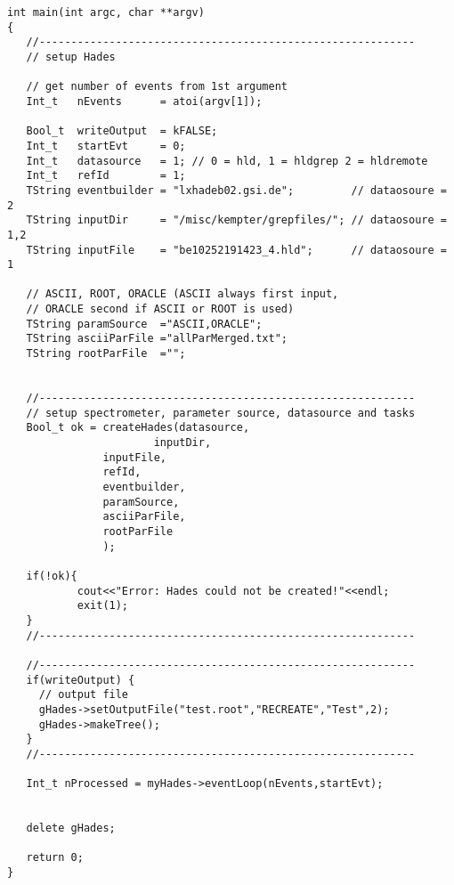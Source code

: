 \begin{lstlisting}
int main(int argc, char **argv)
{
   //-----------------------------------------------------------
   // setup Hades
   
   // get number of events from 1st argument
   Int_t   nEvents      = atoi(argv[1]); 
   
   Bool_t  writeOutput  = kFALSE;
   Int_t   startEvt     = 0;
   Int_t   datasource   = 1; // 0 = hld, 1 = hldgrep 2 = hldremote
   Int_t   refId        = 1;
   TString eventbuilder = "lxhadeb02.gsi.de";         // dataosoure = 2
   TString inputDir     = "/misc/kempter/grepfiles/"; // dataosoure = 1,2
   TString inputFile    = "be10252191423_4.hld";      // dataosoure = 1

   // ASCII, ROOT, ORACLE (ASCII always first input, 
   // ORACLE second if ASCII or ROOT is used)
   TString paramSource  ="ASCII,ORACLE";  
   TString asciiParFile ="allParMerged.txt";
   TString rootParFile  ="";

   
   //-----------------------------------------------------------
   // setup spectrometer, parameter source, datasource and tasks
   Bool_t ok = createHades(datasource,
        	           inputDir,
			   inputFile,
			   refId,
			   eventbuilder,
			   paramSource,
			   asciiParFile,
			   rootParFile
			   );
   
   if(!ok){
           cout<<"Error: Hades could not be created!"<<endl;
           exit(1);
   }
   //-----------------------------------------------------------

   //-----------------------------------------------------------
   if(writeOutput) {
     // output file
     gHades->setOutputFile("test.root","RECREATE","Test",2);
     gHades->makeTree();
   }
   //-----------------------------------------------------------
   
   Int_t nProcessed = myHades->eventLoop(nEvents,startEvt);


   delete gHades;

   return 0;
}
\end{lstlisting} \label{dst_macro}
\clearpage





